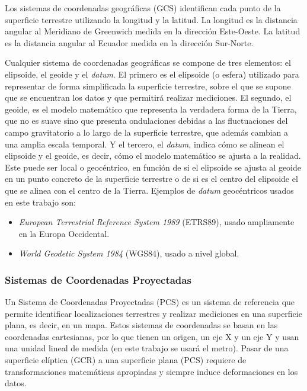 \documentclass[12pt,a4paper,]{book}
\providecommand{\tightlist}{%
  \setlength{\itemsep}{0pt}\setlength{\parskip}{0pt}}
\numberwithin{dummy}{section}
\theoremstyle{ocrenumbox}
\theoremstyle{blacknumex}
\theoremstyle{blacknumbox}
\theoremstyle{ocrenum}
\theoremstyle{ocrenum}
\begin{document}
Los sistemas de coordenadas geográficas (GCS) identifican cada punto de
la superficie terrestre utilizando la longitud y la latitud. La longitud
es la distancia angular al Meridiano de Greenwich medida en la dirección
Este-Oeste. La latitud es la distancia angular al Ecuador medida en la
dirección Sur-Norte.

Cualquier sistema de coordenadas geográficas se compone de tres
elementos: el elipsoide, el geoide y el \emph{datum}. El primero es el
elipsoide (o esfera) utilizado para representar de forma simplificada la
superficie terrestre, sobre el que se supone que se encuentran los datos
y que permitirá realizar mediciones. El segundo, el geoide, es el modelo
matemático que representa la verdadera forma de la Tierra, que no es
suave sino que presenta ondulaciones debidas a las fluctuaciones del
campo gravitatorio a lo largo de la superficie terrestre, que además
cambian a una amplia escala temporal. Y el tercero, el \emph{datum},
indica cómo se alinean el elipsoide y el geoide, es decir, cómo el
modelo matemático se ajusta a la realidad. Este puede ser local o
geocéntrico, en función de si el elipsoide se ajusta al geoide en un
punto concreto de la superficie terrestre o de si es el centro del
elipsoide el que se alinea con el centro de la Tierra. Ejemplos de
\emph{datum} geocéntricos usados en este trabajo son:

\begin{itemize}
\tightlist
\item
  \emph{European Terrestrial Reference System 1989} (ETRS89), usado
  ampliamente en la Europa Occidental.
\item
  \emph{World Geodetic System 1984} (WGS84), usado a nivel global.
\end{itemize}

\hypertarget{sistemas-de-coordenadas-proyectadas}{%
\subsubsection*{Sistemas de Coordenadas
Proyectadas}\label{sistemas-de-coordenadas-proyectadas}}

Un Sistema de Coordenadas Proyectadas (PCS) es un sistema de referencia
que permite identificar localizaciones terrestres y realizar mediciones
en una superficie plana, es decir, en un mapa. Estos sistemas de
coordenadas se basan en las coordenadas cartesianas, por lo que tienen
un origen, un eje X y un eje Y y usan una unidad lineal de medida (en
este trabajo se usará el metro). Pasar de una superficie elíptica (GCR)
a una superficie plana (PCS) requiere de transformaciones matemáticas
apropiadas y siempre induce deformaciones en los datos.
\end{document}
